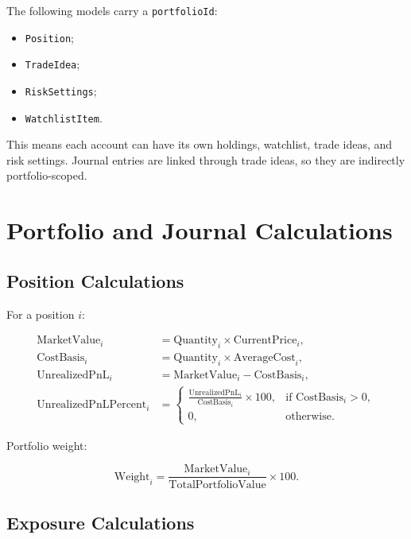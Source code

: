 \documentclass[11pt]{article}
\begin{document}
The following models carry a \texttt{portfolioId}:

\begin{itemize}[noitemsep]
  \item \texttt{Position};
  \item \texttt{TradeIdea};
  \item \texttt{RiskSettings};
  \item \texttt{WatchlistItem}.
\end{itemize}

This means each account can have its own holdings, watchlist, trade ideas, and risk settings. Journal entries are linked through trade ideas, so they are indirectly portfolio-scoped.

\section{Portfolio and Journal Calculations}

\subsection{Position Calculations}

For a position \(i\):

\begin{align}
\text{MarketValue}_i &= \text{Quantity}_i \times \text{CurrentPrice}_i, \\
\text{CostBasis}_i &= \text{Quantity}_i \times \text{AverageCost}_i, \\
\text{UnrealizedPnL}_i &= \text{MarketValue}_i - \text{CostBasis}_i, \\
\text{UnrealizedPnLPercent}_i &=
  \begin{cases}
    \frac{\text{UnrealizedPnL}_i}{\text{CostBasis}_i} \times 100, & \text{if CostBasis}_i > 0, \\
    0, & \text{otherwise}.
  \end{cases}
\end{align}

Portfolio weight:

\begin{equation}
\text{Weight}_i = \frac{\text{MarketValue}_i}{\text{TotalPortfolioValue}} \times 100.
\end{equation}

\subsection{Exposure Calculations}
\end{document}
